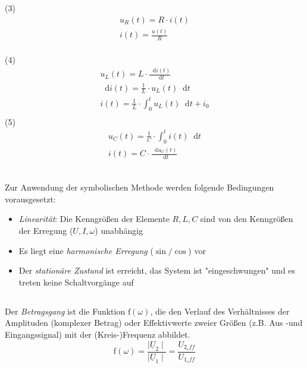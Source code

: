 \documentclass[a4paper, 12pt]{article}
\newcommand*\dif{\mathop{}\!\mathrm{d}}
\begin{document}
\subsection{}
  (3)\\
  \begin{gather*}
    u_R(t)   = R \cdot i(t)\\
    i(t)      = \frac{u(t)}{R}\\
  \end{gather*}

  (4)\\
  \begin{gather*}
        u_L(t) = L \cdot \frac{\dif i(t)}{\dif t}\\
    \dif i(t)  = \frac{1}{L} \cdot u_L(t) \dif t\\
        i(t)   = \frac{1}{L} \cdot \int_0^t{u_L(t) \dif t} + i_0\\
  \end{gather*}
  \indent(5)\\
  \begin{gather*}
    u_C(t)   = \frac{1}{C} \cdot \int_0^t{i(t) \dif t}\\
    i(t)     = C \cdot \frac{\dif u_C(t)}{\dif t}\\
  \end{gather*}

\subsection{}
  Zur Anwendung der symbolischen Methode werden folgende Bedingungen vorausgesetzt:
  \begin{itemize}
    \item \emph{Linearität}: Die Kenngrößen der Elemente $R, L, C$ sind von den Kenngrößen der Erregung ($U, I, \omega$) unabhängig
    \item Es liegt eine \emph{harmonische Erregung} ($\sin \text{/} \cos$) vor
    \item Der \emph{stationäre Zustand} ist erreicht, das System ist "eingeschwungen" und es treten keine Schaltvorgänge auf
  \end{itemize}

\subsection{}
  Der \emph{Betragsgang} ist die Funktion $\text{f}(\omega)$, die den Verlauf des Verhältnisses der Amplituden (komplexer Betrag) oder Effektivwerte zweier Größen (z.B. Aus -und Eingangssignal) mit der (Kreis-)Frequenz abbildet.
  $$ \text{f}(\omega) = \frac{ \mid \underline{U}_2 \mid }{ \mid \underline{U}_1 \mid } =  \frac{ U_{2_eff} }{ U_{1_eff} }$$\\
\end{document}
